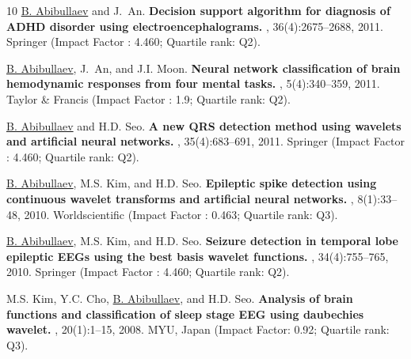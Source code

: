 \documentclass[10pt,letterpaper,sans]{moderncv}   %
\begin{document}
\begin{thebibliography}{10}
    \underline{B. Abibullaev} and J.~An.
    \newblock \textbf{Decision support algorithm for diagnosis of {ADHD} disorder using electroencephalograms.}
    , 36(4):2675--2688, 2011. Springer (Impact Factor : 4.460; Quartile rank: Q2).
    
    \underline{B. Abibullaev}, J.~An, and J.I. Moon.
    \newblock \textbf{Neural network classification of brain hemodynamic responses from four mental tasks.} , 5(4):340--359, 2011. Taylor \&  Francis (Impact Factor : 1.9; Quartile rank: Q2).
    
    \underline{B. Abibullaev} and H.D. Seo.
    \newblock \textbf{A new {QRS} detection method using wavelets and artificial neural networks.} , 35(4):683--691, 2011. Springer (Impact Factor : 4.460; Quartile rank: Q2).
    
    \underline{B. Abibullaev}, M.S. Kim, and H.D. Seo.
    \newblock \textbf{Epileptic spike detection using continuous wavelet transforms and artificial neural networks.} , 8(1):33--48, 2010.  Worldscientific (Impact Factor : 0.463; Quartile rank: Q3).
    
    \underline{B. Abibullaev}, M.S. Kim, and H.D. Seo.
    \newblock \textbf{Seizure detection in temporal lobe epileptic {EEGs} using the best basis wavelet functions.} , 34(4):755--765, 2010. Springer (Impact Factor : 4.460; Quartile rank: Q2).
    
    M.S. Kim, Y.C. Cho, \underline{B. Abibullaev}, and H.D. Seo.
    \newblock \textbf{Analysis of brain functions and classification of sleep stage {EEG} using daubechies wavelet.} , 20(1):1--15, 2008. MYU, Japan (Impact Factor: 0.92; Quartile rank: Q3).

\end{thebibliography}
\vspace{0.2cm}
\end{document}

